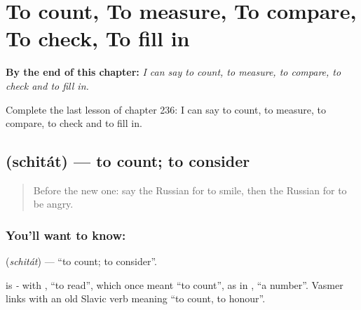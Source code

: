 
\chapter{To count, To measure, To compare, To check, To fill in}
\label{ch:ru-to-count-to-measure-to-compare-to-check-to-fill-in}

\begin{chapteropening}
\textbf{By the end of this chapter:} \emph{I can say to count, to measure, to compare, to check and to fill in.}

Complete the last lesson of chapter 236: I can say to count, to measure, to compare, to check and to fill in.
\end{chapteropening}

\section[\texorpdfstring{\ru{считать} (schitát)}{считать (schitát)}]{ (schitát) — to count; to consider}

\label{lesson:RU-C236-schitat}



\begin{quote}
Before the new one: say the Russian for to smile, then the Russian for to be angry.
\end{quote}

\subsection*{You'll want to know: }
\textbf{} (\emph{schitát}) — \textquotedblleft{}to count; to consider\textquotedblright{}.

\begin{cousinweb}
\textbf{} is \emph{-} with \emph{}, \textquotedblleft{}to read\textquotedblright{}, which once meant \textquotedblleft{}to count\textquotedblright{}, as in \emph{}, \textquotedblleft{}a number\textquotedblright{}. Vasmer links \emph{} with an old Slavic verb meaning \textquotedblleft{}to count, to honour\textquotedblright{}.
\end{cousinweb}

